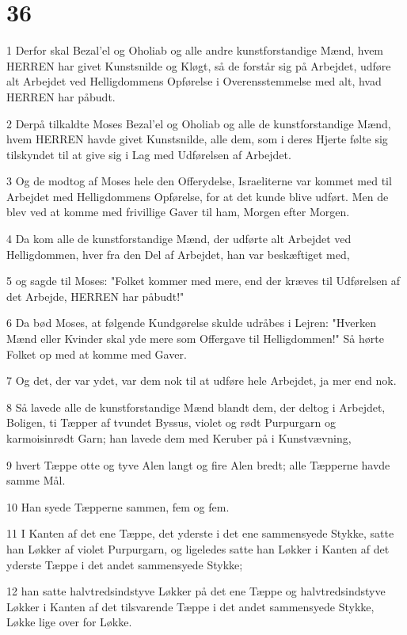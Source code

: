 \chapter{36}

\par 1 Derfor skal Bezal'el og Oholiab og alle andre kunstforstandige Mænd, hvem HERREN har givet Kunstsnilde og Kløgt, så de forstår sig på Arbejdet, udføre alt Arbejdet ved Helligdommens Opførelse i Overensstemmelse med alt, hvad HERREN har påbudt.
\par 2 Derpå tilkaldte Moses Bezal'el og Oholiab og alle de kunstforstandige Mænd, hvem HERREN havde givet Kunstsnilde, alle dem, som i deres Hjerte følte sig tilskyndet til at give sig i Lag med Udførelsen af Arbejdet.
\par 3 Og de modtog af Moses hele den Offerydelse, Israeliterne var kommet med til Arbejdet med Helligdommens Opførelse, for at det kunde blive udført. Men de blev ved at komme med frivillige Gaver til ham, Morgen efter Morgen.
\par 4 Da kom alle de kunstforstandige Mænd, der udførte alt Arbejdet ved Helligdommen, hver fra den Del af Arbejdet, han var beskæftiget med,
\par 5 og sagde til Moses: "Folket kommer med mere, end der kræves til Udførelsen af det Arbejde, HERREN har påbudt!"
\par 6 Da bød Moses, at følgende Kundgørelse skulde udråbes i Lejren: "Hverken Mænd eller Kvinder skal yde mere som Offergave til Helligdommen!" Så hørte Folket op med at komme med Gaver.
\par 7 Og det, der var ydet, var dem nok til at udføre hele Arbejdet, ja mer end nok.
\par 8 Så lavede alle de kunstforstandige Mænd blandt dem, der deltog i Arbejdet, Boligen, ti Tæpper af tvundet Byssus, violet og rødt Purpurgarn og karmoisinrødt Garn; han lavede dem med Keruber på i Kunstvævning,
\par 9 hvert Tæppe otte og tyve Alen langt og fire Alen bredt; alle Tæpperne havde samme Mål.
\par 10 Han syede Tæpperne sammen, fem og fem.
\par 11 I Kanten af det ene Tæppe, det yderste i det ene sammensyede Stykke, satte han Løkker af violet Purpurgarn, og ligeledes satte han Løkker i Kanten af det yderste Tæppe i det andet sammensyede Stykke;
\par 12 han satte halvtredsindstyve Løkker på det ene Tæppe og halvtredsindstyve Løkker i Kanten af det tilsvarende Tæppe i det andet sammensyede Stykke, Løkke lige over for Løkke.
